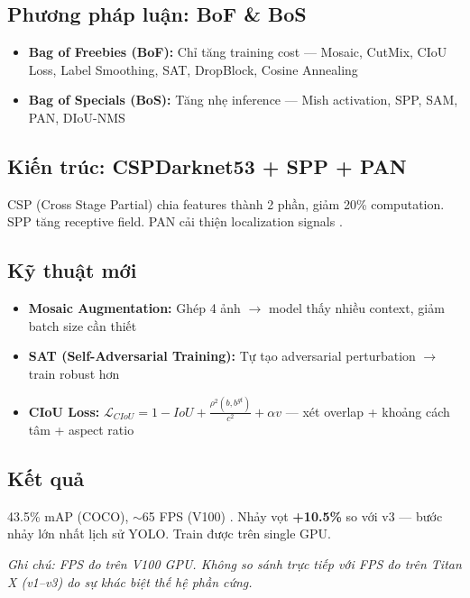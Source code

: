 \subsection{Phương pháp luận: BoF \& BoS}
\begin{itemize}
    \item \textbf{Bag of Freebies (BoF):} Chỉ tăng training cost --- Mosaic, CutMix, CIoU Loss, Label Smoothing, SAT, DropBlock, Cosine Annealing
    \item \textbf{Bag of Specials (BoS):} Tăng nhẹ inference --- Mish activation, SPP, SAM, PAN, DIoU-NMS
\end{itemize}

\subsection{Kiến trúc: CSPDarknet53 + SPP + PAN}
CSP (Cross Stage Partial) chia features thành 2 phần, giảm 20\% computation. SPP tăng receptive field. PAN cải thiện localization signals \cite{yolov4}.

\subsection{Kỹ thuật mới}
\begin{itemize}
    \item \textbf{Mosaic Augmentation:} Ghép 4 ảnh $\rightarrow$ model thấy nhiều context, giảm batch size cần thiết
    \item \textbf{SAT (Self-Adversarial Training):} Tự tạo adversarial perturbation $\rightarrow$ train robust hơn
    \item \textbf{CIoU Loss:} $\mathcal{L}_{CIoU} = 1 - IoU + \frac{\rho^2(b, b^{gt})}{c^2} + \alpha v$ --- xét overlap + khoảng cách tâm + aspect ratio \cite{yolov4}
\end{itemize}

\subsection{Kết quả}
43.5\% mAP (COCO), $\sim$65 FPS (V100) \cite{yolov4}. Nhảy vọt \textbf{+10.5\%} so với v3 --- bước nhảy lớn nhất lịch sử YOLO. Train được trên single GPU.

\textit{Ghi chú: FPS đo trên V100 GPU. Không so sánh trực tiếp với FPS đo trên Titan X (v1--v3) do sự khác biệt thế hệ phần cứng.}
